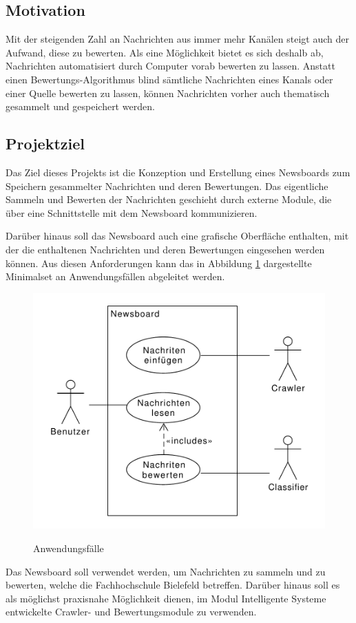 \subsection{Motivation}
Mit der steigenden Zahl an Nachrichten aus immer mehr Kanälen steigt auch der Aufwand,
diese zu bewerten. Als eine Möglichkeit bietet es sich deshalb ab,
Nachrichten automatisiert durch Computer vorab bewerten zu lassen.
Anstatt einen Bewertungs-Algorithmus blind sämtliche Nachrichten eines Kanals
oder einer Quelle bewerten zu lassen, können Nachrichten vorher auch thematisch gesammelt
und gespeichert werden.

\subsection{Projektziel}
Das Ziel dieses Projekts ist die Konzeption und Erstellung eines Newsboards zum Speichern
gesammelter Nachrichten und deren Bewertungen. Das eigentliche Sammeln
und Bewerten der Nachrichten geschieht durch externe Module,
die über eine Schnittstelle mit dem Newsboard kommunizieren.

Darüber hinaus soll das Newsboard auch eine grafische Oberfläche enthalten,
mit der die enthaltenen Nachrichten und deren Bewertungen eingesehen werden können.
Aus diesen Anforderungen kann das in Abbildung \ref{fig:use-cases} dargestellte
Minimalset an Anwendungsfällen abgeleitet werden.

\begin{figure}[h]
	\centering 
	\includegraphics[scale=0.75]{assets/use-cases.pdf}
	\label{fig:use-cases}
	\caption{Anwendungsfälle}
\end{figure}

Das Newsboard soll verwendet werden, um Nachrichten zu sammeln und zu bewerten,
welche die Fachhochschule Bielefeld betreffen. Darüber hinaus soll es
als möglichst praxisnahe Möglichkeit dienen, im Modul Intelligente Systeme entwickelte
Crawler- und Bewertungsmodule zu verwenden.
